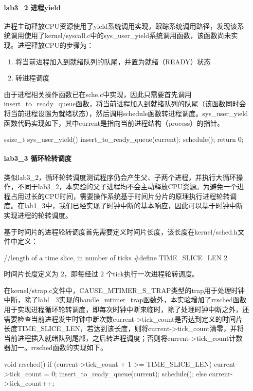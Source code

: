 \paragraph{lab3_2 进程yield}
进程主动释放CPU资源使用了yield系统调用实现，跟踪系统调用路径，发现该系统调用使用了kernel/syscall.c中的sys_user_yield系统调用函数，该函数尚未实现。进程释放CPU的步骤为：
\begin{enumerate}
    \item 将当前进程加入到就绪队列的队尾，并置为就绪（READY）状态
    \item 转进程调度
\end{enumerate}
由于进程相关操作函数已在sche.c中实现，因此只需要首先调用insert_to_ready_queue函数，将当前进程加入到就绪队列的队尾（该函数同时会将当前进程设置为就绪状态），然后调用schedule函数转进程调度。sys_user_yield函数代码实现如下，其中current是指向当前进程结构（process）的指针。

\begin{cppcode}
ssize_t sys_user_yield() {
  insert_to_ready_queue(current);
  schedule();
  return 0;
}
\end{cppcode}
\paragraph{lab3_3 循环轮转调度} 
类似lab3_2，循环轮转调度测试程序仍会产生父、子两个进程，并执行大循环操作，不同于lab3_2，本实验的父子进程均不会主动释放CPU资源。为避免一个进程占用过长的CPU时间，需要操作系统基于时间片分片的原理执行进程轮转调度。在lab1_3中，我们已经实现了时钟中断的基本响应，因此可以基于时钟中断实现进程的轮转调度。

基于时间片的进程轮转调度首先需要定义时间片长度，该长度在kernel/sched.h文件中定义：
\begin{cppcode}
//length of a time slice, in number of ticks
#define TIME_SLICE_LEN  2
\end{cppcode}
时间片长度定义为 $2$，即每经过 $2$ 个tick执行一次进程轮转调度。

在kernel/strap.c文件中，CAUSE_MTIMER_S_TRAP类型的trap用于处理时钟中断，除了lab1_3实现的handle_mtimer_trap函数外，本实验增加了rrsched函数用于实现进程循环轮转调度，即每次时钟中断来临时，除了处理时钟中断之外，还需要检查当前进程发生时钟中断次数current->tick_count是否达到定义的时间片长度TIME_SLICE_LEN，若达到该长度，则将current->tick_count清零，并将当前进程插入就绪队列尾部，之后转进程调度；否则将current->tick_count计数器加一。rrsched函数的实现如下。
\begin{cppcode}
void rrsched() {
    if (current->tick_count + 1 >= TIME_SLICE_LEN) {
        current->tick_count = 0;
        insert_to_ready_queue(current);
        schedule();
    }
    else {
        current->tick_count++;
    }
}
\end{cppcode}

